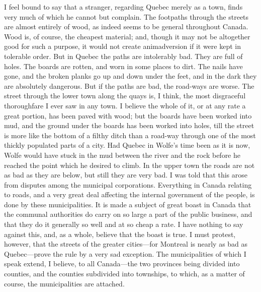 I feel bound to say that a stranger, regarding Quebec merely as a
town, finds very much of which he cannot but complain.  The
footpaths through the streets are almost entirely of wood, as
indeed seems to be general throughout Canada.  Wood is, of course,
the cheapest material; and, though it may not be altogether good
for such a purpose, it would not create animadversion if it were
kept in tolerable order.  But in Quebec the paths are intolerably
bad.  They are full of holes.  The boards are rotten, and worn in
some places to dirt.  The nails have gone, and the broken planks go
up and down under the feet, and in the dark they are absolutely
dangerous.  But if the paths are bad, the road-ways are worse.  The
street through the lower town along the quays is, I think, the most
disgraceful thoroughfare I ever saw in any town.  I believe the
whole of it, or at any rate a great portion, has been paved with
wood; but the boards have been worked into mud, and the ground
under the boards has been worked into holes, till the street is
more like the bottom of a filthy ditch than a road-way through one
of the most thickly populated parts of a city.  Had Quebec in
Wolfe's time been as it is now, Wolfe would have stuck in the mud
between the river and the rock before he reached the point which he
desired to climb.  In the upper town the roads are not as bad as
they are below, but still they are very bad.  I was told that this
arose from disputes among the municipal corporations.  Everything
in Canada relating to roads, and a very great deal affecting the
internal government of the people, is done by these municipalities.
It is made a subject of great boast in Canada that the communal
authorities do carry on so large a part of the public business, and
that they do it generally so well and at so cheap a rate.  I have
nothing to say against this, and, as a whole, believe that the
boast is true.  I must protest, however, that the streets of the
greater cities---for Montreal is nearly as bad as Quebec---prove the
rule by a very sad exception.  The municipalities of which I speak
extend, I believe, to all Canada---the two provinces being divided
into counties, and the counties subdivided into townships, to
which, as a matter of course, the municipalities are attached.

